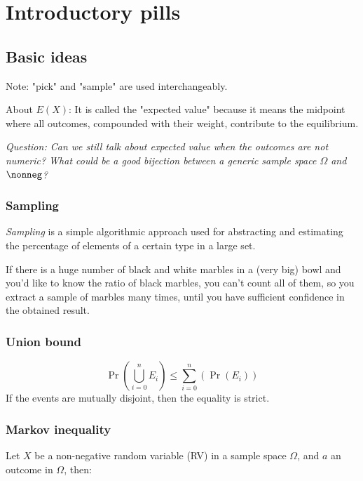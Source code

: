 
\chapter{Introductory pills}

\section{Basic ideas}

	Note: "pick" and "sample" are used interchangeably.

	About $E(X)$: It is called the "expected value" because it means the midpoint where all outcomes, compounded with their weight, contribute to the equilibrium.
	
	\textit{Question: Can we still talk about expected value when the outcomes are not numeric? What could be a good bijection between a generic sample space $\Omega$ and $\nonneg$?}
	
\subsection{Sampling}

	\textit{Sampling} is a simple algorithmic approach used for abstracting and estimating the percentage of elements of a certain type in a large set.
	
	\ex If there is a huge number of black and white marbles in a (very big) bowl and you'd like to know the ratio of black marbles, you can't count all of them, so you extract a sample of marbles many times, until you have sufficient confidence in the obtained result.


\subsection{Union bound}
	
	\begin{equation}
	\Pr\left(\bigcup_{i=0}^n E_i\right) \leq \sum_{i=0}^{n}(\Pr(E_i))
	\end{equation}
	If the events are mutually disjoint, then the equality is strict.

	
\subsection{Markov inequality}
	
	Let $X$ be a non-negative random variable (RV) in a sample space $\Omega$, and $a$ an outcome in $\Omega$, then:
	
